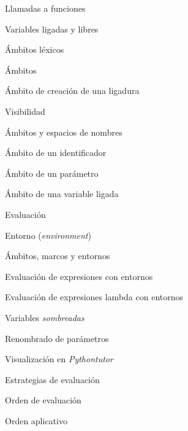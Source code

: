 \begin{longenum}
\begin{longenum}
\begin{longenum}
\begin{longenum}
                \item Llamadas a funciones
            \end{longenum}
            \item Variables ligadas y libres
        \end{longenum}
        \item Ámbitos léxicos
        \begin{longenum}
            \item Ámbitos
            \item Ámbito de creación de una ligadura
            \begin{longenum}
                \item Visibilidad
            \end{longenum}
            \item Ámbitos y espacios de nombres
            \item Ámbito de un identificador
            \item Ámbito de un parámetro
            \item Ámbito de una variable ligada
        \end{longenum}
        \item Evaluación
        \begin{longenum}
            \item Entorno (\textit{environment})
            \begin{longenum}
                \item Ámbitos, marcos y entornos
            \end{longenum}
            \item Evaluación de expresiones con entornos
            \item Evaluación de expresiones lambda con entornos
            \begin{longenum}
                \item Variables \textit{sombreadas}
                \item Renombrado de parámetros
                \item Visualización en \textit{Pythontutor}
            \end{longenum}
            \item Estrategias de evaluación 
            \begin{longenum}
                \item Orden de evaluación
                \begin{longenum}
                    \item Orden aplicativo

\end{longenum}
\end{longenum}
\end{longenum}
\end{longenum}
\end{longenum}

